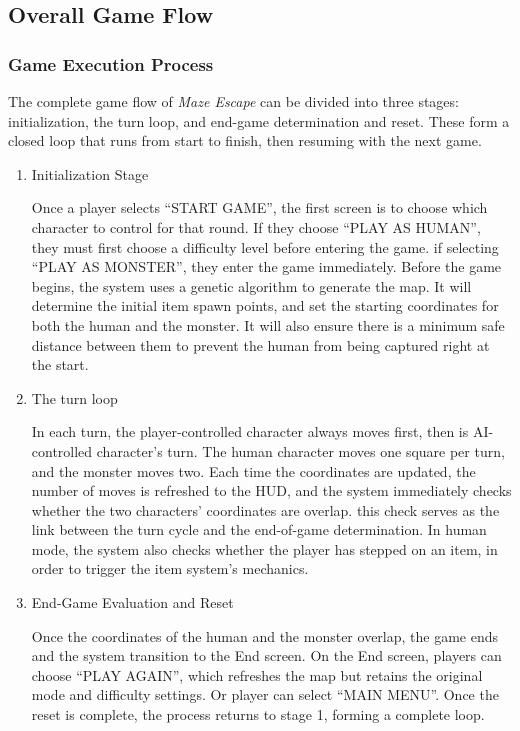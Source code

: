 \documentclass[12pt,a4paper]{article}
\begin{document}
\subsection{Overall Game Flow}

\subsubsection{Game Execution Process}

The complete game flow of \textit{Maze Escape} can be divided into three stages: initialization, the turn loop, and end-game determination and reset. These form a closed loop that runs from start to finish, then resuming with the next game.

\begin{enumerate}
\item Initialization Stage

Once a player selects ``START GAME'', the first screen is to choose which character to control for that round. If they choose ``PLAY AS HUMAN'', they must first choose a difficulty level before entering the game. if selecting ``PLAY AS MONSTER'', they enter the game immediately. Before the game begins, the system uses a genetic algorithm to generate the map. It will determine the initial item spawn points, and set the starting coordinates for both the human and the monster. It will also ensure there is a minimum safe distance between them to prevent the human from being captured right at the start.

\item The turn loop

In each turn, the player-controlled character always moves first, then is AI-controlled character's turn. The human character moves one square per turn, and the monster moves two. Each time the coordinates are updated, the number of moves is refreshed to the HUD, and the system immediately checks whether the two characters' coordinates are overlap. this check serves as the link between the turn cycle and the end-of-game determination. In human mode, the system also checks whether the player has stepped on an item, in order to trigger the item system's mechanics.

\item End-Game Evaluation and Reset

Once the coordinates of the human and the monster overlap, the game ends and the system transition to the End screen. On the End screen, players can choose ``PLAY AGAIN'', which refreshes the map but retains the original mode and difficulty settings. Or player can select ``MAIN MENU''. Once the reset is complete, the process returns to stage 1, forming a complete loop.
\end{enumerate}
\end{document}

